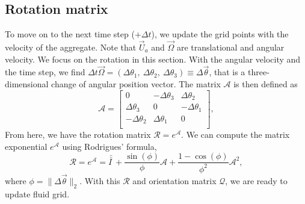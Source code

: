 \subsection{Rotation matrix}
To move on to the next time step ($+ \Delta t$), we update the grid points with the velocity of the aggregate. Note that $\vec{U}_a$ and $\vec{\Omega}$ are translational and angular velocity. We focus on the rotation in this section. With the angular velocity and the time step, we find $\Delta t \vec{\Omega} = \left( \Delta \theta_1, \ \Delta \theta_2, \ \Delta \theta_3 \right) \equiv \Delta \vec{\theta}$, that is a three-dimensional change of angular position vector. 
The matrix $\mathcal{A}$ is then defined as 
\begin{equation}
	\mathcal{A}
	=\begin{bmatrix}
	 0 & - \Delta \theta_3 & \Delta \theta_2  \\
	 \Delta \theta_3 & 0  & -\Delta \theta_1  \\
	 - \Delta \theta_2 & \Delta \theta_1 & 0  \\
	\end{bmatrix},
	\label{eq_rotation_mx}
\end{equation}
From here, we have the rotation matrix $\mathcal{R} = e^{\mathcal{A}}.$
We can compute the matrix exponential $e^{\mathcal{A}}$ using Rodrigues' formula,
\begin{equation}
	\mathcal{R} = 
e^{\mathcal{A}} 
 = \bar{\bar{I \ }} 
 + \frac{\sin(\phi)}{\phi} \mathcal{A}
 + \frac{1-\cos(\phi)}{\phi^2} \mathcal{A}^2,
\label{eq_R_eA}
\end{equation} 
where $\phi = \|\Delta \vec{\theta}\|_2$.
With this $\mathcal{R}$ and orientation matrix $\mathcal{Q}$, we are ready to update fluid grid.


	
